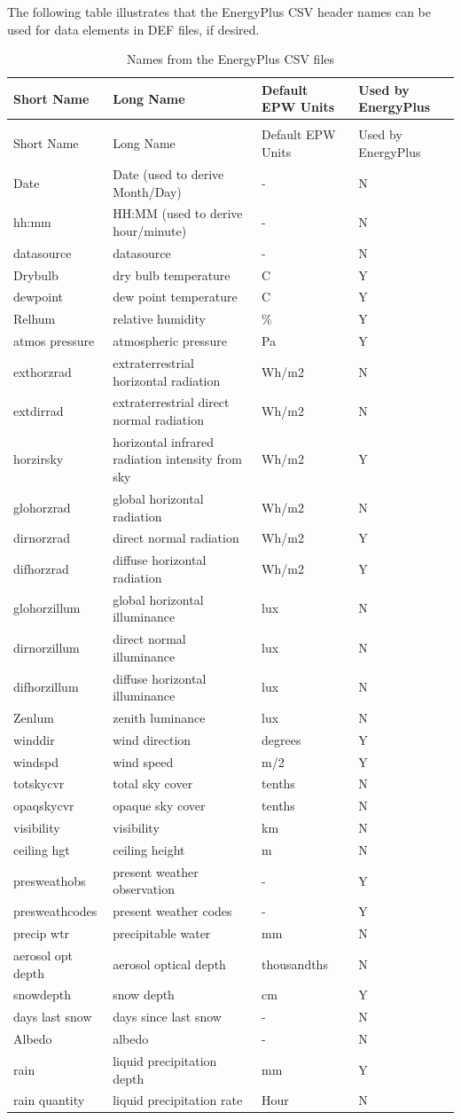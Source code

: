 The following table illustrates that the EnergyPlus CSV header names can be used for data elements in DEF files, if desired.

\begin{longtable}[c]{p{1.5in}p{1.5in}p{1.5in}p{1.5in}}
\caption{Names from the EnergyPlus CSV files \label{table:names-from-the-energyplus-csv-files}} \tabularnewline
\toprule 
Short Name & Long Name & Default EPW Units & Used by EnergyPlus \tabularnewline \midrule
\endfirsthead

\caption[]{Names from the EnergyPlus CSV files} \tabularnewline
\toprule 
Short Name & Long Name & Default EPW Units & Used by EnergyPlus \tabularnewline \midrule
\endhead

Date & Date (used to derive Month/Day) & - & N \tabularnewline
hh:mm & HH:MM (used to derive hour/minute) & - & N \tabularnewline
datasource & datasource & - & N \tabularnewline
Drybulb & dry bulb temperature & C & Y \tabularnewline
dewpoint & dew point temperature & C & Y \tabularnewline
Relhum & relative humidity & \% & Y \tabularnewline
atmos pressure & atmospheric pressure & Pa & Y \tabularnewline
exthorzrad & extraterrestrial horizontal radiation & Wh/m2 & N \tabularnewline
extdirrad & extraterrestrial direct normal radiation & Wh/m2 & N \tabularnewline
horzirsky & horizontal infrared radiation intensity from sky & Wh/m2 & Y \tabularnewline
glohorzrad & global horizontal radiation & Wh/m2 & N \tabularnewline
dirnorzrad & direct normal radiation & Wh/m2 & Y \tabularnewline
difhorzrad & diffuse horizontal radiation & Wh/m2 & Y \tabularnewline
glohorzillum & global horizontal illuminance & lux & N \tabularnewline
dirnorzillum & direct normal illuminance & lux & N \tabularnewline
difhorzillum & diffuse horizontal illuminance & lux & N \tabularnewline
Zenlum & zenith luminance & lux & N \tabularnewline
winddir & wind direction & degrees & Y \tabularnewline
windspd & wind speed & m/2 & Y \tabularnewline
totskycvr & total sky cover & tenths & N \tabularnewline
opaqskycvr & opaque sky cover & tenths & N \tabularnewline
visibility & visibility & km & N \tabularnewline
ceiling hgt & ceiling height & m & N \tabularnewline
presweathobs & present weather observation & - & Y \tabularnewline
presweathcodes & present weather codes & - & Y \tabularnewline
precip wtr & precipitable water & mm & N \tabularnewline
aerosol opt depth & aerosol optical depth & thousandths & N \tabularnewline
snowdepth & snow depth & cm & Y \tabularnewline
days last snow & days since last snow & - & N \tabularnewline
Albedo & albedo & - & N \tabularnewline
rain & liquid precipitation depth & mm & Y \tabularnewline
rain quantity & liquid precipitation rate & Hour & N \tabularnewline
\bottomrule
\end{longtable}

